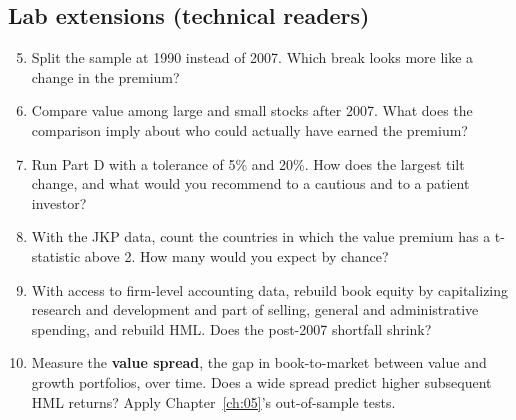 \subsection*{Lab extensions (technical readers)}

\begin{enumerate}
  \setcounter{enumi}{4}
  \item Split the sample at 1990 instead of 2007. Which break looks more like a change in the premium?
  \item Compare value among large and small stocks after 2007. What does the comparison imply about who could actually have earned the premium?
  \item Run Part D with a tolerance of 5\% and 20\%. How does the largest tilt change, and what would you recommend to a cautious and to a patient investor?
  \item With the JKP data, count the countries in which the value premium has a t-statistic above 2. How many would you expect by chance?
  \item With access to firm-level accounting data, rebuild book equity by capitalizing research and development and part of selling, general and administrative spending, and rebuild HML. Does the post-2007 shortfall shrink?
  \item Measure the \textbf{value spread}, the gap in book-to-market between value and growth portfolios, over time. Does a wide spread predict higher subsequent HML returns? Apply Chapter~\ref{ch:05}'s out-of-sample tests.
\end{enumerate}